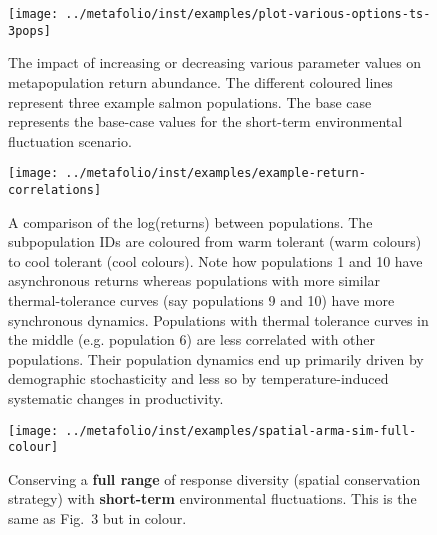 \clearpage


\begin{figure}[htbp]
\centering
\texttt{[image: ../metafolio/inst/examples/plot-various-options-ts-3pops]}
\caption{The impact of increasing or decreasing various parameter values on
metapopulation return abundance. The different coloured lines represent three
example salmon populations. The base case represents the base-case values for
the short-term environmental fluctuation scenario.}
\label{f:eg-sens}
\end{figure}

\clearpage


\begin{figure}[htbp]
\centering
\texttt{[image: ../metafolio/inst/examples/example-return-correlations]}
\caption{A comparison of the log(returns) between populations. The
subpopulation IDs are coloured from warm tolerant (warm colours) to cool
tolerant (cool colours). Note how populations 1 and 10 have asynchronous
returns whereas populations with more similar thermal-tolerance curves (say
populations 9 and 10) have more synchronous dynamics. Populations with
thermal tolerance curves in the middle (e.g. population 6) are less
correlated with other populations. Their population dynamics end up primarily
driven by demographic stochasticity and less so by temperature-induced
systematic changes in productivity.}
\label{f:ret-corr}
\end{figure}

\clearpage


\begin{figure}[htbp]
\centering
\texttt{[image: ../metafolio/inst/examples/spatial-arma-sim-full-colour]}
\caption{Conserving a \textbf{full range} of response diversity (spatial
conservation strategy) with \textbf{short-term} environmental fluctuations. This is the same as Fig.~3 but in colour.}
\label{f:eg-sp-arma-full}
\end{figure}

\clearpage

